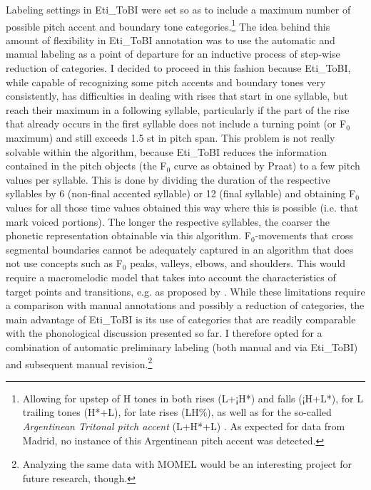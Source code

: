 Labeling settings in Eti\_ToBI were set so as to include a maximum number of possible pitch accent and boundary tone categories.{\footnote{Allowing for upstep of H tones in both rises (L+¡H*) and falls (¡H+L*), for L trailing tones (H*+L), for late rises (LH\%), as well as for the so-called \textit{Argentinean Tritonal pitch accent} (L+H*+L) \citep{GabrielFeldhausenETAL.2010}. As expected for data from Madrid, no instance of this Argentinean pitch accent was detected.}} The idea behind this amount of flexibility in Eti\_ToBI annotation was to use the automatic and manual labeling as a point of departure for an inductive process of step-wise reduction of categories. I decided to proceed in this fashion because Eti\_ToBI, while capable of recognizing some pitch accents and boundary tones very consistently, has difficulties in dealing with rises that start in one syllable, but reach their maximum in a following syllable, particularly if the part of the rise that already occurs in the first syllable does not include a turning point (or F$_0$ maximum) and still exceeds 1.5 st in pitch span. This problem is not really solvable within the algorithm, because Eti\_ToBI reduces the information contained in the pitch objects (the F$_0$ curve as obtained by Praat) to a few pitch values per syllable. This is done by dividing the duration of the respective syllables by 6 (non-final accented syllable) or 12 (final syllable) and obtaining F$_0$ values for all those time values obtained this way where this is possible (i.e. that mark voiced portions). The longer the respective syllables, the coarser the phonetic representation obtainable via this algorithm. F$_0$-movements that cross segmental boundaries cannot be adequately captured in an algorithm that does not use concepts such as F$_0$ peaks, valleys, elbows, and shoulders. This would require a macromelodic model that takes into account the characteristics of target points and transitions, e.g. as proposed by \citet{Hirst.2011}. While these limitations require a comparison with manual annotations and possibly a reduction of categories, the main advantage of Eti\_ToBI is its use of categories that are readily comparable with the phonological discussion presented so far. I therefore opted for a combination of automatic preliminary labeling (both manual and via Eti\_ToBI) and subsequent manual revision.\footnote{Analyzing the same data with MOMEL \citep{LPL.2008} would be an interesting project for future research, though.}


